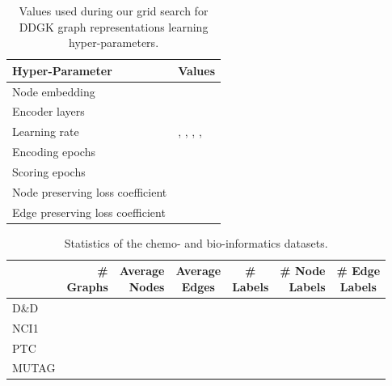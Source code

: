 \documentclass[sigconf]{acmart}
\newcommand{\ours}{\textsc{DDGK}}
\begin{document}
\begin{table}[tb]
\begin{tabular}{l|l}
\textbf{Hyper-Parameter}& \textbf{Values}\\\hline
Node embedding &  \\ 
Encoder layers &  \\
Learning rate & , , , ,  \\
Encoding epochs &  \\
Scoring epochs &  \\
Node preserving loss coefficient &  \\ 
Edge preserving loss coefficient &  \\ 
\end{tabular}
\vspace{3mm}
\caption{Values used during our grid search for  \ours{} graph representations learning hyper-parameters.}
\label{table:ddgkparams}
\end{table}


\begin{table}[tb]
\begin{tabular}{l|rrccrc}
&\thead{\bf \#\\\bf Graphs}
&\thead{\bf Average\\\bf Nodes}
&\thead{\bf Average\\\bf Edges}
&\thead{\bf \#\\\bf Labels}
&\thead{\bf \# Node\\\bf Labels}
&\thead{\bf \# Edge\\\bf Labels}
\\\hline
D\&D &  &   &   &  &  &  \\
NCI1 &  &  &  &  &  &  \\
PTC &  &  &  &  &  &  \\
MUTAG &  &  &  &  &  &  \\
\end{tabular}
\vspace{3mm}
\caption{Statistics of the chemo- and bio-informatics datasets.}
\label{table:datasetprop}
\end{table}
\end{document}
